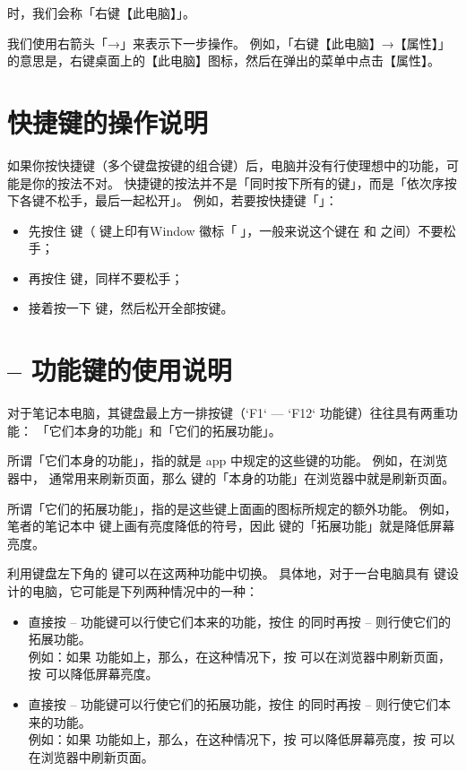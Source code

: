 \documentclass[a4paper]{book}
\begin{document}
\noindent 时，我们会称「右键【此电脑】」。

我们使用右箭头「→」来表示下一步操作。
例如，「右键【此电脑】→【属性】」的意思是，右键桌面上的【此电脑】图标，然后在弹出的菜单中点击【属性】。

\section{快捷键的操作说明}

如果你按快捷键（多个键盘按键的组合键）后，电脑并没有行使理想中的功能，可能是你的按法不对。
快捷键的按法并不是「同时按下所有的键」，而是「依次序按下各键不松手，最后一起松开」。
例如，若要按快捷键「」：

\begin{itemize}
  \item 先按住  键（ 键上印有Window 徽标「」，一般来说这个键在  和  之间）不要松手；
  \item 再按住  键，同样不要松手；
  \item 接着按一下  键，然后松开全部按键。
\end{itemize}

\section{ --  功能键的使用说明}

对于笔记本电脑，其键盘最上方一排按键（`F1` — `F12` 功能键）往往具有两重功能：
「它们本身的功能」和「它们的拓展功能」。

所谓「它们本身的功能」，指的就是 app 中规定的这些键的功能。
例如，在浏览器中， 通常用来刷新页面，那么  键的「本身的功能」在浏览器中就是刷新页面。

所谓「它们的拓展功能」，指的是这些键上面画的图标所规定的额外功能。
例如，笔者的笔记本中  键上画有亮度降低的符号，因此  键的「拓展功能」就是降低屏幕亮度。

利用键盘左下角的  键可以在这两种功能中切换。
具体地，对于一台电脑具有  键设计的电脑，它可能是下列两种情况中的一种：

\begin{itemize}
  \item 直接按  --  功能键可以行使它们本来的功能，按住  的同时再按  --  则行使它们的拓展功能。\\
    例如：如果  功能如上，那么，在这种情况下，按  可以在浏览器中刷新页面，按  可以降低屏幕亮度。
  \item 直接按  --  功能键可以行使它们的拓展功能，按住  的同时再按  --  则行使它们本来的功能。\\
    例如：如果  功能如上，那么，在这种情况下，按  可以降低屏幕亮度，按  可以在浏览器中刷新页面。
\end{itemize}
\end{document}
